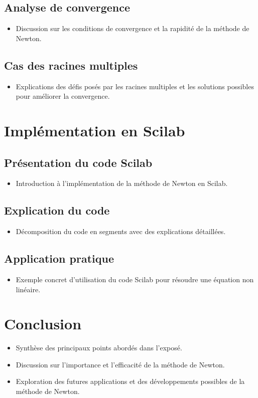 \documentclass{article}
\begin{document}
\subsection{Analyse de convergence}
\begin{itemize}
    \item Discussion sur les conditions de convergence et la rapidité de la méthode de Newton.
\end{itemize}
\subsection{Cas des racines multiples}
\begin{itemize}
    \item Explications des défis posés par les racines multiples et les solutions possibles pour améliorer la convergence.
\end{itemize}

\section{Implémentation en Scilab}
\subsection{Présentation du code Scilab}
\begin{itemize}
    \item Introduction à l'implémentation de la méthode de Newton en Scilab.
\end{itemize}
\subsection{Explication du code}
\begin{itemize}
    \item Décomposition du code en segments avec des explications détaillées.
\end{itemize}
\subsection{Application pratique}
\begin{itemize}
    \item Exemple concret d'utilisation du code Scilab pour résoudre une équation non linéaire.
\end{itemize}

\section{Conclusion}
\begin{itemize}
    \item Synthèse des principaux points abordés dans l'exposé.
    \item Discussion sur l'importance et l'efficacité de la méthode de Newton.
    \item Exploration des futures applications et des développements possibles de la méthode de Newton.
\end{itemize}
\end{document}
